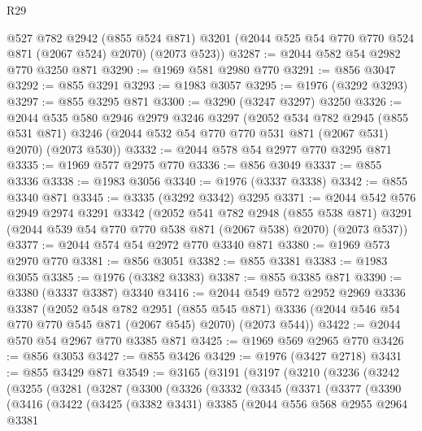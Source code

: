 \begin{lexlean}{R29}
\begin{coremodule}
      @527
      @782
      @2942
      (@855 @524 @871)
      @3201
      (@2044 @525 @54 @770 @770 @524 @871 (@2067 @524) @2070)
      (@2073 @523))
@3287 := @2044 @582 @54 @2982 @770 @3250 @871
@3290 := @1969 @581 @2980 @770
@3291 := @856 @3047
@3292 := @855 @3291
@3293 := @1983 @3057
@3295 := @1976 (@3292 @3293)
@3297 := @855 @3295 @871
@3300 := @3290 (@3247 @3297) @3250
@3326 := @2044
    @535
    @580
    @2946
    @2979
    @3246
    @3297
    (@2052
      @534
      @782
      @2945
      (@855 @531 @871)
      @3246
      (@2044 @532 @54 @770 @770 @531 @871 (@2067 @531) @2070)
      (@2073 @530))
@3332 := @2044 @578 @54 @2977 @770 @3295 @871
@3335 := @1969 @577 @2975 @770
@3336 := @856 @3049
@3337 := @855 @3336
@3338 := @1983 @3056
@3340 := @1976 (@3337 @3338)
@3342 := @855 @3340 @871
@3345 := @3335 (@3292 @3342) @3295
@3371 := @2044
    @542
    @576
    @2949
    @2974
    @3291
    @3342
    (@2052
      @541
      @782
      @2948
      (@855 @538 @871)
      @3291
      (@2044 @539 @54 @770 @770 @538 @871 (@2067 @538) @2070)
      (@2073 @537))
@3377 := @2044 @574 @54 @2972 @770 @3340 @871
@3380 := @1969 @573 @2970 @770
@3381 := @856 @3051
@3382 := @855 @3381
@3383 := @1983 @3055
@3385 := @1976 (@3382 @3383)
@3387 := @855 @3385 @871
@3390 := @3380 (@3337 @3387) @3340
@3416 := @2044
    @549
    @572
    @2952
    @2969
    @3336
    @3387
    (@2052
      @548
      @782
      @2951
      (@855 @545 @871)
      @3336
      (@2044 @546 @54 @770 @770 @545 @871 (@2067 @545) @2070)
      (@2073 @544))
@3422 := @2044 @570 @54 @2967 @770 @3385 @871
@3425 := @1969 @569 @2965 @770
@3426 := @856 @3053
@3427 := @855 @3426
@3429 := @1976 (@3427 @2718)
@3431 := @855 @3429 @871
@3549 := @3165
    (@3191
      (@3197
        (@3210
          (@3236
            (@3242
              (@3255
                (@3281
                  (@3287
                    (@3300
                      (@3326
                        (@3332
                          (@3345
                            (@3371
                              (@3377
                                (@3390
                                  (@3416
                                    (@3422
                                      (@3425
                                        (@3382 @3431)
                                        @3385
                                        (@2044
                                          @556
                                          @568
                                          @2955
                                          @2964
                                          @3381

\end{coremodule}
\end{lexlean}
